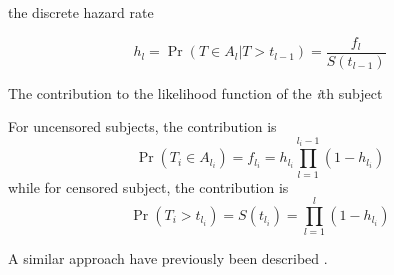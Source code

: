 the discrete hazard rate

\begin{equation}
    h_l = \Pr (T \in A_l | T > t_{l-1}) = \frac{f_l}{S(t_{l-1})}
\end{equation}

    
The contribution to the likelihood function of the \textit{i}th subject

For uncensored subjects, the contribution is
%
\begin{equation}
    \Pr (T_i \in A_{l_i}) = f_{l_i} = h_{l_i} \prod_{l=1}^{l_i-1}(1-h_{l_i})
\end{equation}
%
while for censored subject, the contribution is
%
\begin{equation}
    \Pr (T_i > t_{l_i}) = S(t_{l_i}) = \prod_{l=1}^{l}(1-h_{l_i})
\end{equation}

A similar approach have previously been described \autocite{biganzoliFeed1998}.

